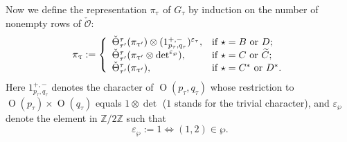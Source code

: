 \documentclass[12pt,a4paper]{amsart}
\def\abs#1{\left|{#1}\right|}
\newcommand{\CO}{{\mathcal {O}}}
\newcommand{\oO}{\operatorname{O}}
\newcommand{\Z}{\mathbb{Z}}
\numberwithin{equation}{section}
\theoremstyle{remark}
\begin{document}
 Now we define the representation $\pi_{\uptau}$ of $G_\tau$ by induction on the number of nonempty rows of $\check \CO$:
 \begin{equation}\label{eq:def-pi}
    \pi_{\uptau}:=\left\{
     \begin{array}{ll}
         \check \Theta_{\tau'}^{\tau}(\pi_{\uptau'})\otimes (1_{p_\tau, q_\tau}^{+,-})^{\varepsilon_{\tau}}, &\hbox{if  $\star=B$ or $D$}; \\
         \check \Theta_{\tau'}^{\tau}(\pi_{\uptau'}\otimes \det^{\varepsilon_{\wp}}), &\hbox{if $\star=C$ or $\widetilde C$}; \\
              \check \Theta_{\tau'}^{\tau}(\pi_{\uptau'}), &\hbox{if $\star=C^*$ or $D^*$}. \\
            \end{array}
   \right.
 \end{equation}
 Here $1_{p_\tau, q_\tau}^{+,-}$ denotes the character of $\oO(p_\tau, q_\tau)$ whose restriction to $\oO(p_\tau)\times \oO(q_\tau)$ equals $1\otimes \det$ ($1$ stands for the trivial character), and
$\varepsilon_{\wp}$ denote the element in $\Z/2\Z$ such that  \[
 \varepsilon_{\wp}:=1\Leftrightarrow  (1,2)\in \wp.
\]
\end{document}
